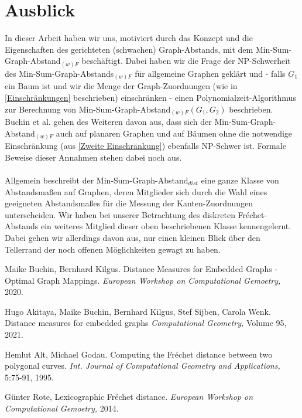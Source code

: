 \documentclass[a4paper, 12pt, twoside]{article}
\theoremstyle{Format1} %
\begin{document}
\section{Ausblick}
In dieser Arbeit haben wir uns, motiviert durch das Konzept und die Eigenschaften des gerichteten (schwachen) Graph-Abstands, mit dem
Min-Sum-Graph-Abstand$_{(w)F}$ beschäftigt. Dabei haben wir die Frage der NP-Schwerheit des Min-Sum-Graph-Abstands$_{(w)F}$ für allgemeine
Graphen geklärt und - falls $G_1$ ein Baum ist und wir die Menge der Graph-Zuordnungen (wie in \ref{Einschränkungen} beschrieben) einschränken -
einen Polynomialzeit-Algorithmus zur Berechnung von Min-Sum-Graph-Abstand$_{(w)F}(G_1, G_2)$ beschrieben.
\\
Buchin et al. gehen des Weiteren davon aus, dass sich der Min-Sum-Graph-Abstand$_{(w)F}$ auch auf planaren Graphen und
auf Bäumen ohne die notwendige Einschränkung (aus \ref{Zweite Einschränkung}) ebenfalls NP-Schwer ist.
Formale Beweise dieser Annahmen stehen dabei noch aus.
\\
\\
Allgemein beschreibt der Min-Sum-Graph-Abstand$_{dist}$ eine ganze Klasse von Abstandsmaßen auf Graphen, deren Mitglieder sich durch die Wahl
eines geeigneten Abstandsmaßes für die Messung der Kanten-Zuordnungen unterscheiden.
Wir haben bei unserer Betrachtung des diskreten Fréchet-Abstands ein weiteres Mitglied dieser oben beschriebenen Klasse kennengelernt.
Dabei gehen wir allerdings davon aus, nur einen kleinen Blick über den Tellerrand der noch offenen Möglichkeiten gewagt zu haben.
\newpage\null\thispagestyle{empty}\newpage

\begin{thebibliography}{4}
		Maike Buchin, Bernhard Kilgus. Distance Measures for Embedded Graphs - Optimal Graph Mappings.
		\textit{European Workshop on Computational Gemoetry,} 2020.

		Hugo Akitaya, Maike Buchin, Bernhard Kilgus, Stef Sijben, Carola Wenk. Distance measures for embedded graphs
		\textit{Computational Geometry,} Volume 95, 2021.

		Hemlut Alt, Michael Godau. Computing the Fréchet distance between two polygonal curves.
		\textit{Int. Journal of Computational Geometry and Applications,} 5:75-91, 1995.

		Günter Rote, Lexicographic Fréchet distance.
		\textit{European Workshop on Computational Gemoetry,} 2014.

\end{thebibliography}


\end{document}
